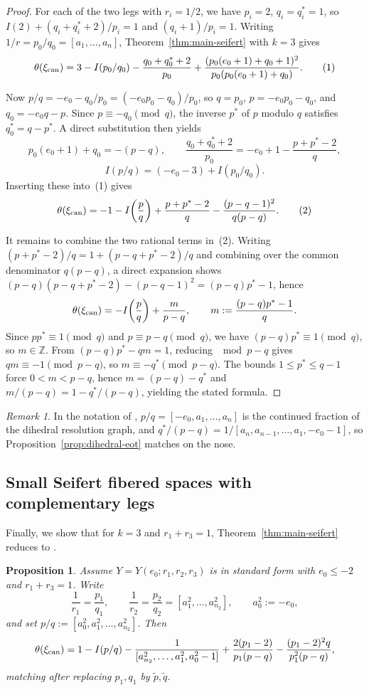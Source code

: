 \documentclass[11pt]{amsart}
\theoremstyle{plain}
\newtheorem{proposition}[theorem]{Proposition}
\theoremstyle{definition}
\theoremstyle{remark}
\newtheorem{remark}[theorem]{Remark}
\newcommand{\Z}{\mathbb{Z}}
\begin{document}
\begin{proof}
For each of the two legs with $r_i=1/2$, we have $p_i=2$,
$q_i=q_i^*=1$, so $I(2)+(q_i+q_i^*+2)/p_i=1$ and $(q_i+1)/p_i=1$.
Writing $1/r=p_0/q_0=[a_1,\dots,a_n]$, Theorem~\ref{thm:main-seifert}
with $k=3$ gives
\[
\theta(\xi_{\rm can})
=
3-I(p_0/q_0)-\frac{q_0+q_0^*+2}{p_0}
+\frac{(p_0(e_0+1)+q_0+1)^2}{p_0(p_0(e_0+1)+q_0)}.
\tag{1}
\]

Now $p/q=-e_0-q_0/p_0=(-e_0p_0-q_0)/p_0$, so $q=p_0$,
$p=-e_0p_0-q_0$, and $q_0=-e_0q-p$. Since $p\equiv -q_0\pmod q$, the
inverse $p^*$ of $p$ modulo $q$ satisfies $q_0^*=q-p^*$. A direct
substitution then yields
\[
p_0(e_0+1)+q_0=-(p-q),\qquad
\frac{q_0+q_0^*+2}{p_0}=-e_0+1-\frac{p+p^*-2}{q},
\]
\[
I(p/q)=(-e_0-3)+I(p_0/q_0).
\]
Inserting these into~(1) gives
\[
\theta(\xi_{\rm can})
=
-1-I\!\left(\frac{p}{q}\right)
+\frac{p+p^*-2}{q}
-\frac{(p-q-1)^2}{q(p-q)}.
\tag{2}
\]

It remains to combine the two rational terms in~(2). Writing
$(p+p^*-2)/q=1+(p-q+p^*-2)/q$ and combining over the common
denominator $q(p-q)$, a direct expansion shows
$(p-q)(p-q+p^*-2)-(p-q-1)^2=(p-q)p^*-1$, hence
\[
\theta(\xi_{\rm can})
=
-I\!\left(\frac{p}{q}\right)+\frac{m}{p-q},
\qquad
m:=\frac{(p-q)p^*-1}{q}.
\]
Since $pp^*\equiv 1\pmod q$ and $p\equiv p-q\pmod q$, we have
$(p-q)p^*\equiv 1\pmod q$, so $m\in\Z$. From $(p-q)p^*-qm=1$,
reducing $\!\!\!\mod p-q$ gives $qm\equiv -1\pmod{p-q}$, so
$m\equiv -q^*\pmod{p-q}$. The bounds $1\le p^*\le q-1$ force
$0<m<p-q$, hence $m=(p-q)-q^*$ and $m/(p-q)=1-q^*/(p-q)$, yielding
the stated formula.
\end{proof}

\begin{remark}\label{rem:dihedral-eot}
In the notation of \cite{EtnyreOzbagciTosun2025},
$p/q=[-e_0,a_1,\dots,a_n]$ is the continued fraction of the dihedral
resolution graph, and $q^*/(p-q)=1/[a_n,a_{n-1},\dots,a_1,-e_0-1]$, so
Proposition~\ref{prop:dihedral-eot} matches
\cite[Prop.~9.8]{EtnyreOzbagciTosun2025} on the nose.
\end{remark}

\subsection{Small Seifert fibered spaces with complementary legs}
Finally, we show that for $k=3$ and $r_1+r_3=1$,
Theorem~\ref{thm:main-seifert} reduces to
\cite[Prop.~4.4]{EtnyreOzbagciTosun2026}.

\begin{proposition}\label{prop:general-to-EOT-complementary}
Assume $Y=Y(e_0;r_1,r_2,r_3)$ is in standard form with $e_0\le -2$
and $r_1+r_3=1$. Write
\[
\frac{1}{r_1}=\frac{p_1}{q_1},\qquad
\frac{1}{r_2}=\frac{p_2}{q_2}=[a^2_1,\dots,a^2_{n_2}],\qquad
a^2_0:=-e_0,
\]
and set $p/q:=[a^2_0,a^2_1,\dots,a^2_{n_2}]$. Then
\[
\theta(\xi_{\rm can})
=
1-I(p/q)
-\frac{1}{[a^2_{n_2},\dots,a^2_1,a^2_0-1]}
+\frac{2(p_1-2)}{p_1(p-q)}
-\frac{(p_1-2)^2q}{p_1^2(p-q)},
\]
matching \cite[Prop.~4.4]{EtnyreOzbagciTosun2026} after replacing
$p_1,q_1$ by $\tilde{p},\tilde{q}$.
\end{proposition}
\end{document}
